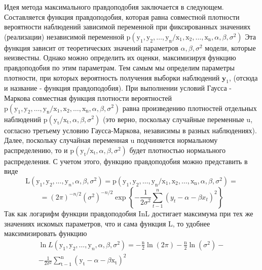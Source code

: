 \documentclass[a4paper, 12pt]{article}
\begin{document}
	Идея метода максимального правдоподобия заключается в следующем. Составляется функция правдоподобия, которая равна совместной плотности вероятности наблюдений зависимой переменной при фиксированных значениях (реализации) независимой переменной $\mathrm{p}\left(\mathrm{y}_{1}, \mathrm{y}_{2}, \ldots, \mathrm{y}_{\mathrm{n}} / \mathrm{x}_{1}, \mathrm{x}_{2}, \ldots, \mathrm{x}_{\mathrm{n}}, \alpha, \beta, \sigma^{2}\right)$
	Эта функция зависит от теоретических значений параметров $\alpha, \beta, \sigma^{2}$ модели, которые неизвестны. Однако можно определить их оценки, максимизируя функцию правдоподобия по этим параметрам. Тем самым мы определим параметры плотности, при которых вероятность получения выборки наблюдений $\mathbf{y}_{1}$,
	(отсюда и название - функция правдоподобия). При выполнении условий Гаусса - Маркова совместная функция плотности вероятностей $\mathrm{p}\left(\mathrm{y}_{1}, \mathrm{y}_{2}, \ldots, \mathrm{y}_{\mathrm{n}} / \mathrm{x}_{1}, \mathrm{x}_{2}, \ldots, \mathrm{x}_{\mathrm{n}}, \alpha, \beta, \sigma^{2}\right)$ равна произведению плотностей отдельных наблюдений $\mathrm{p}\left(\mathrm{y}_{\mathrm{t}} / \mathrm{x}_{\mathrm{t}}, \alpha, \beta, \sigma^{2}\right)$ (это верно, поскольку случайные переменные
	u, согласно третьему условию Гаусса-Маркова, независимы в разных наблюдениях). Далее, поскольку случайная переменная u подчиняется нормальному распределению, то и $\mathrm{p}\left(\mathrm{y}_{\mathrm{t}} / \mathrm{x}_{\mathrm{t}}, \alpha, \beta, \sigma^{2}\right)$ будет плотностью нормального распределения. С учетом этого, функцию правдоподобия можно представить в виде
	$$
	\mathrm{L}\left(\mathrm{y}_{1}, \mathrm{y}_{2}, \ldots, \mathrm{y}_{n}, \alpha, \beta, \sigma^{2}\right)=\mathrm{p}\left(\mathrm{y}_{1}, \mathrm{y}_{2}, \ldots, \mathrm{y}_{\mathrm{n}} / \mathrm{x}_{1}, \mathrm{x}_{2}, \ldots, \mathrm{x}_{\mathrm{n}}, \alpha, \beta, \sigma^{2}\right)=
	$$
	$$
	=(2 \pi)^{-n / 2}\left(\sigma^{2}\right)^{-n / 2} \exp \left\{-\frac{1}{2 \sigma^{2}} \sum_{t-1}^{n}\left(y_{t}-\alpha-\beta x_{t}\right)^{2}\right\}
	$$
	Так как логарифм функции правдоподобия InL достигает максимума при тех же значениях искомых параметров, что и сама функция L, то удобнее максимизировать функцию
	$$
	\begin{array}{c}
		\ln L\left(\mathrm{y}_{1}, \mathrm{y}_{2}, \ldots, \mathrm{y}_{n}, \alpha, \beta, \sigma^{2}\right)=-\frac{\mathrm{n}}{2} \ln (2 \pi)-\frac{\mathrm{n}}{2} \ln \left(\sigma^{2}\right)- \\
		-\frac{1}{2 \sigma^{2}} \sum_{\mathrm{t}-1}^{\mathrm{n}}\left(\mathrm{y}_{\mathrm{t}}-\alpha-\beta \mathrm{x}_{\mathrm{t}}\right)^{2}
	\end{array}
	$$
\end{document}
